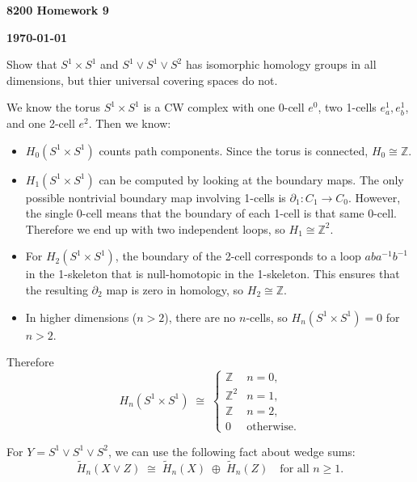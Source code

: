 \documentclass[12pt]{article}
\begin{document}
\begin{newtitle}
  \begin{center}
    \textbf{\Huge 8200 Homework 9}
  \end{center}
  \textbf{} \hfill \textbf{\today}
\end{newtitle}

\begin{statement}[1]
  Show that $S^1 \times S^1$ and $S^1 \vee S^1 \vee S^2$ has isomorphic homology groups in all dimensions, but thier universal 
  covering spaces do not.
\end{statement}
\begin{newproof}
  We know the torus $S^1 \times S^1$ is a CW complex with one 0-cell $e^0$, two 1-cells $e^1_a, e^1_b$, and one 2-cell $e^2$.
  Then  we know:
  \begin{itemize}
    \item $H_0(S^1 \times S^1)$ counts path components. Since the torus is connected, $H_0 \cong \mathbb{Z}$.
    \item $H_1(S^1 \times S^1)$ can be computed by looking at the boundary maps. The only possible nontrivial boundary map involving 1-cells 
      is $\partial_1: C_1 \to C_0$. However, the single 0-cell means that the boundary of each 1-cell is that same 0-cell. 
      Therefore we end up with two independent loops, so $H_1 \cong \mathbb{Z}^2$.
    \item For $H_2(S^1 \times S^1)$, the boundary of the 2-cell corresponds to a loop $aba^{-1}b^{-1}$ in the 1-skeleton that is 
      null-homotopic in the 1-skeleton. This ensures that the resulting $\partial_2$ map is zero in homology, so 
      $H_2 \cong \mathbb{Z}$. 
    \item In higher dimensions ($n>2$), there are no $n$-cells, so $H_n(S^1 \times S^1) = 0$ for $n>2$.
  \end{itemize}

  Therefore
  $$ H_n(S^1 \times S^1) \;\cong\;
    \begin{cases}
      \mathbb{Z} & n=0,\\
      \mathbb{Z}^2 & n=1,\\
      \mathbb{Z} & n=2,\\
      0 & \text{otherwise}.
    \end{cases} $$

  For $Y = S^1 \vee S^1 \vee S^2$, we can use the following fact about wedge sums: $$ \widetilde{H}_n(X \vee Z) \;\cong\; 
    \widetilde{H}_n(X) \;\oplus\; \widetilde{H}_n(Z) \quad \text{for all } n\ge1. $$


\end{newproof}
\end{document}
